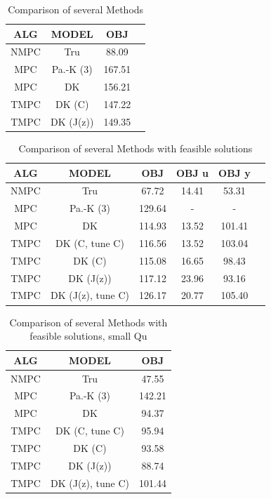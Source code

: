 \documentclass[preprint,12pt,authoryear]{elsarticle}
\begin{document}
\begin{table}[h]
  \centering
  \caption{Comparison of several Methods}
  \label{tab:ident-comp}
  \begin{tabular}{cccc}
      \toprule
        ALG & MODEL & OBJ \\
        \midrule
        NMPC & Tru & 88.09  \\%
        MPC & Pa.-K (3) & 167.51  \\
        MPC & DK & 156.21  \\
        TMPC & DK (C) & 147.22  \\
        TMPC & DK (J(z)) & 149.35  \\
        \bottomrule
  \end{tabular}
\end{table}

\begin{table}[h]
  \centering
  \caption{Comparison of several Methods with feasible solutions}
  \label{tab:ident-comp}
  \begin{tabular}{cccccc}
      \toprule
        ALG & MODEL & OBJ & OBJ u & OBJ y \\
        \midrule
        NMPC & Tru & 67.72 & 14.41 & 53.31 \\%
        MPC & Pa.-K (3) & 129.64 & - & - \\
        MPC & DK & 114.93 & 13.52 & 101.41 \\
        TMPC & DK (C, tune C) & 116.56 & 13.52 & 103.04 \\
        TMPC & DK (C) & 115.08 & 16.65 & 98.43 \\
        TMPC & DK (J(z)) & 117.12 & 23.96 & 93.16 \\
        TMPC & DK (J(z), tune C) & 126.17 & 20.77 & 105.40 \\
        \bottomrule
  \end{tabular}
\end{table}

\begin{table}[h]
  \centering
  \caption{Comparison of several Methods with feasible solutions, small Qu}
  \label{tab:ident-comp}
  \begin{tabular}{ccc}
      \toprule
        ALG & MODEL & OBJ \\
        \midrule
        NMPC & Tru & 47.55 \\%
        MPC & Pa.-K (3) & 142.21 \\
        MPC & DK & 94.37 \\
        TMPC & DK (C, tune C) & 95.94 \\
        TMPC & DK (C) & 93.58 \\
        TMPC & DK (J(z)) & 88.74 \\
        TMPC & DK (J(z), tune C) & 101.44 \\
        \bottomrule
  \end{tabular}
\end{table}
\end{document}

